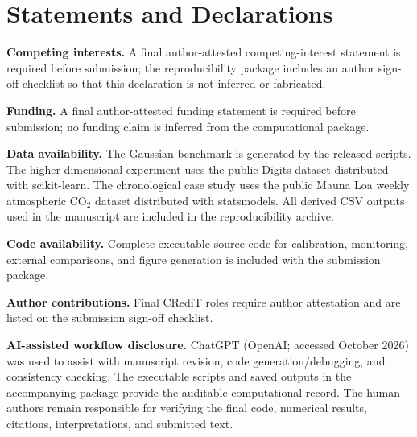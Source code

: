\documentclass[11pt,a4paper]{article}
\theoremstyle{definition}
\newcommand{\1}{\mathbf{1}}
\begin{document}
\section*{Statements and Declarations}
\textbf{Competing interests.} A final author-attested competing-interest statement is required before submission; the reproducibility package includes an author sign-off checklist so that this declaration is not inferred or fabricated.\par
\textbf{Funding.} A final author-attested funding statement is required before submission; no funding claim is inferred from the computational package.\par
\textbf{Data availability.} The Gaussian benchmark is generated by the released scripts. The higher-dimensional experiment uses the public Digits dataset distributed with scikit-learn. The chronological case study uses the public Mauna Loa weekly atmospheric CO$_2$ dataset distributed with statsmodels. All derived CSV outputs used in the manuscript are included in the reproducibility archive.\par
\textbf{Code availability.} Complete executable source code for calibration, monitoring, external comparisons, and figure generation is included with the submission package.\par
\textbf{Author contributions.} Final CRediT roles require author attestation and are listed on the submission sign-off checklist.\par
\textbf{AI-assisted workflow disclosure.} ChatGPT (OpenAI; accessed October 2026) was used to assist with manuscript revision, code generation/debugging, and consistency checking. The executable scripts and saved outputs in the accompanying package provide the auditable computational record. The human authors remain responsible for verifying the final code, numerical results, citations, interpretations, and submitted text.\par
\end{document}

